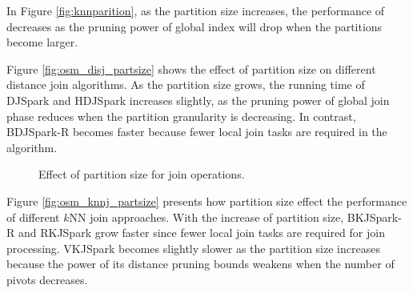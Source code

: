 \begin{appendix}
In Figure \ref{fig:knnparition}, as the partition size increases,
the performance of \name decreases as the pruning power of global
index will drop when the partitions become larger.

Figure \ref{fig:osm_disj_partsize} shows the effect of partition size
on different distance join algorithms. As the partition size grows,
the running time of DJSpark and HDJSpark increases slightly, as the
pruning power of global join phase reduces when the partition
granularity is decreasing.  In contrast, BDJSpark-R becomes faster
because fewer local join tasks are required in the algorithm.

\begin{figure}[!h]
	\caption{Effect of partition size for join operations.}\vspace{-2mm}
	\label{fig:partsize_on_join}
\end{figure}

Figure \ref{fig:osm_knnj_partsize} presents how partition size effect
the performance of different $k$NN join approaches. With the increase
of partition size, BKJSpark-R and RKJSpark grow faster since fewer
local join tasks are required for join processing. VKJSpark becomes
slightly slower as the partition size increases because the power of
its distance pruning bounds weakens when the number of pivots decreases.



\end{appendix}
